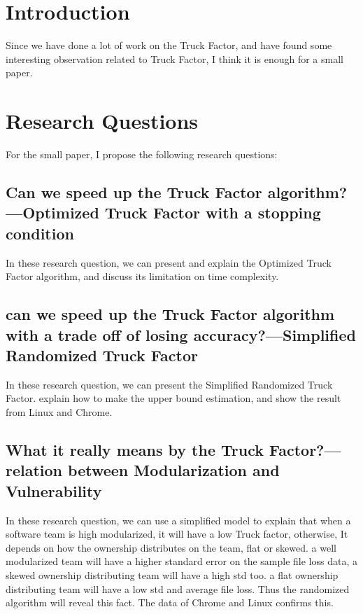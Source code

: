 \documentclass[letterpaper,11pt]{texMemo} %
\begin{document}
\maketitle %

\section{Introduction}
Since we have done a lot of work on the Truck Factor, and have found some interesting observation related to Truck Factor, I think it is enough for a small paper. 
\section{Research Questions}
For the small paper, I propose the following research questions:
\subsection{Can we speed up the Truck Factor algorithm?---Optimized Truck Factor with a stopping condition}
In these research question, we can present and explain the Optimized Truck Factor algorithm, and discuss its limitation on time complexity.
\subsection{can we speed up the Truck Factor algorithm with a trade off of losing accuracy?---Simplified Randomized Truck Factor}
In these research question, we can present the Simplified Randomized Truck Factor. explain how to make the upper bound estimation, and show the result from Linux and Chrome. 
\subsection{What it really means by the Truck Factor?---relation between Modularization and Vulnerability}
In these research question, we can use a simplified model to explain that when a software team is high modularized, it will have a low Truck factor, otherwise, It depends on how the ownership distributes on the team, flat or skewed. a well modularized team will have a higher standard error on the sample file loss data, a skewed ownership distributing team will have a high std too. a flat ownership distributing team will have a low std and average file loss. Thus the randomized algorithm will reveal this fact. The data of Chrome and Linux confirms this. 
\end{document}
